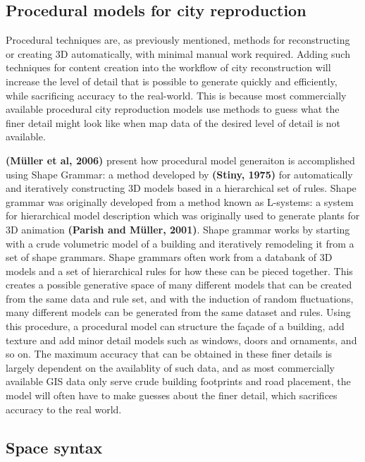 \documentclass{kththesis}
\begin{document}
\subsection{Procedural models for city reproduction}

Procedural techniques are, as previously mentioned, methods for reconstructing or creating 3D automatically, with minimal manual work required.
Adding such techniques for content creation into the workflow of city reconstruction will increase the level of detail that is possible to generate quickly and efficiently, while sacrificing accuracy to the real-world.
This is because most commercially available procedural city reproduction models use methods to guess what the finer detail might look like when map data of the desired level of detail is not available.

\textbf{(Müller et al, 2006)} present how procedural model generaiton is accomplished using Shape Grammar: a method developed by \textbf{(Stiny, 1975)} for automatically and iteratively constructing 3D models based in a hierarchical set of rules.
Shape grammar was originally developed from a method known as L-systems: a system for hierarchical model description which was originally used to generate plants for 3D animation \textbf{(Parish and Müller, 2001)}.
Shape grammar works by starting with a crude volumetric model of a building and iteratively remodeling it from a set of shape grammars.
Shape grammars often work from a databank of 3D models and a set of hierarchical rules for how these can be pieced together.
This creates a possible generative space of many different models that can be created from the same data and rule set, and with the induction of random fluctuations, many different models can be generated from the same dataset and rules.
Using this procedure, a procedural model can structure the façade of a building, add texture and add minor detail models such as windows, doors and ornaments, and so on.
The maximum accuracy that can be obtained in these finer details is largely dependent on the availablity of such data, and as most commercially available GIS data only serve crude building footprints and road placement, the model will often have to make guesses about the finer detail, which sacrifices accuracy to the real world.

\subsection{Space syntax}
\end{document}
